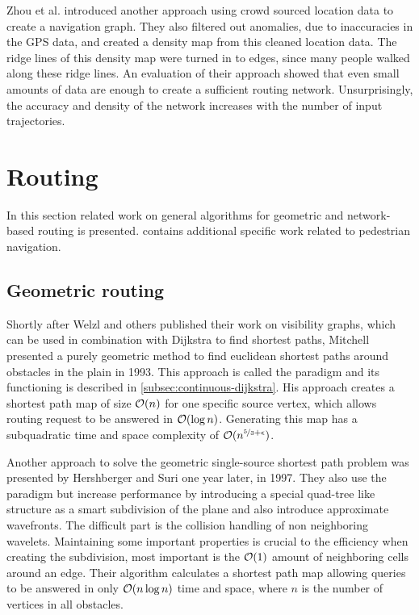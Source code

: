 		Zhou et al. introduced another approach using crowd sourced location data to create a navigation graph\cite{zhou-crowd-sourced-navigation}.
		They also filtered out anomalies, due to inaccuracies in the GPS data, and created a density map from this cleaned location data.
		The ridge lines of this density map were turned in to edges, since many people walked along these ridge lines.
		An evaluation of their approach showed that even small amounts of data are enough to create a sufficient routing network.
		Unsurprisingly, the accuracy and density of the network increases with the number of input trajectories.
	
\section{Routing}

	In this section related work on general algorithms for geometric and network-based routing is presented.
	 contains additional specific work related to pedestrian navigation.
	
	\subsection{Geometric routing}
	
		\label{related-work:mitchell}
		Shortly after Welzl and others published their work on visibility graphs, which can be used in combination with Dijkstra to find shortest paths, Mitchell presented a purely geometric method to find euclidean shortest paths around obstacles in the plain in 1993\cite{mitchell-shortest-path}.
		This approach is called the  paradigm and its functioning is described in \cref{subsec:continuous-dijkstra}.
		His approach creates a shortest path map of size $\mathcal{O}(n)$ for one specific source vertex, which allows routing request to be answered in $\mathcal{O}(\log{n})$.
		Generating this map has a subquadratic time and space complexity of $\mathcal{O}(n^{\nicefrac{5}{3}+\epsilon})$.
		
		Another approach to solve the geometric single-source shortest path problem was presented by Hershberger and Suri one year later, in 1997\cite{hershberger-suri}.
		They also use the  paradigm but increase performance by introducing a special quad-tree like structure as a smart subdivision of the plane and also introduce approximate wavefronts.
		The difficult part is the collision handling of non neighboring wavelets.
		Maintaining some important properties is crucial to the efficiency when creating the subdivision, most important is the $\mathcal{O}(1)$ amount of neighboring cells around an edge.
		Their algorithm calculates a shortest path map allowing queries to be answered in only $\mathcal{O}(n \log n)$ time and space, where $n$ is the number of vertices in all obstacles.
		
